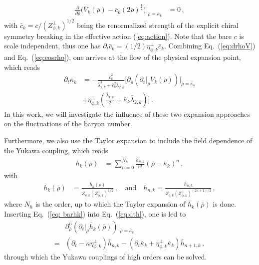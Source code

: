 \documentclass[%
reprint,
superscriptaddress,
showpacs,preprintnumbers,
 amsmath,amssymb,
 aps,
prd,
]{revtex4-1}
\def\Eq#1{Eq.~(\ref{#1})}
\def\eq#1{(\ref{#1})}
\begin{document}
\begin{align}
  \frac{\partial}{\partial \bar \rho}\Big(\bar V_k(\bar \rho)-\bar c_k (2\bar \rho)^{\frac{1}{2}}\Big)\bigg|_{\bar \rho=\bar \kappa_k}&=0\,,\label{eq:eosrho}
\end{align}
with $\bar c_k=c/(Z^{\perp}_{\phi,k})^{1/2}$ being the renormalized strength of the explicit chiral symmetry breaking in the effective action \eq{eq:action}. Note that the bare $c$ is scale independent, thus one has $\partial_t \bar c_k=(1/2)\eta_{\phi,k}^{\perp}\bar c_k$. Combining \Eq{eq:drhoV} and \Eq{eq:eosrho}, 
one arrives at the flow of the physical expansion point, which reads
\begin{align}
  \partial_t \bar \kappa_k&=-\frac{\bar c_k^2}{\bar{\lambda}_{1,k}^3+\bar c_k^2\bar{\lambda}_{2,k}}\bigg[\partial_{\bar \rho}\left(\partial_t\big|_{\rho} \bar V_k(\bar \rho)\right)\Big|_{\bar \rho=\bar \kappa_k}\nonumber \\[2ex]
          &+\eta_{\phi,k}^{\perp}\left(\frac{\bar{\lambda}_{1,k}}{2}+\bar\kappa_k\bar{\lambda}_{2,k}\right)\bigg]\,.\label{}
\end{align}
In this work, we will investigate the influence of these two expansion approaches on the fluctuations of the baryon number. 

Furthermore, we also use the Taylor expansion to include the field dependence of the Yukawa coupling, which reads
\begin{align}
  \bar h_k(\bar \rho)&=\sum^{N_h}_{n=0}\frac{\bar h_{n,k}}{n!}(\bar \rho -\bar \kappa_k)^n\,,\label{eq:hTaylor}
\end{align}
with 
\begin{align}
  \bar h_k(\bar \rho)&=\frac{h_k(\rho)}{Z_{q,k}(Z^{\perp}_{\phi,k})^{1/2}}\,,\quad \text{and}\quad \bar h_{n,k}=\frac{h_{n,k}}{Z_{q,k}(Z^{\perp}_{\phi,k})^{(2n+1)/2}}\,,\label{eq: barhk}
\end{align}
where $N_h$ is the order, up to which the Taylor expansion of $\bar h_k(\bar \rho)$ is done. Inserting \Eq{eq: barhk} into \Eq{eq:dth}, one is led to
\begin{align}
  &\partial^n_{\bar \rho}\left(\partial_t\big|_{\rho} \bar h_k(\bar \rho)\right)\Big|_{\bar \rho=\bar \kappa_k}\nonumber\\[2ex]
=&(\partial_t -n\eta_{\phi,k}^{\perp})\bar h_{n,k}-(\partial_t \bar \kappa_k+\eta_{\phi,k}^{\perp}\bar \kappa_k)\bar h_{n+1,k}\,,\label{}
\end{align}
through which the Yukawa couplings of high orders can be solved.
\end{document}

